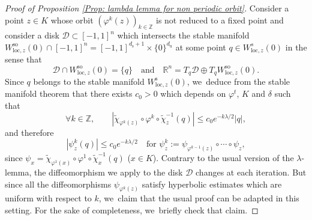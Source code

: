 \documentclass[JEP,XML,SOM,Unicode,NoEqCountersInSection,NoFloatCountersInSection,published]{cedram}
\newcommand{\loc}{\mathrm{loc}}
\newcommand{\rs}{\mathrm{s}}
\newcommand{\rso}{\mathrm{so}}
\newcommand{\ru}{\mathrm{u}}
\theoremstyle{definition}
\theoremstyle{plain}
\newcommand{\D}{\mathcal{D}}
\newcommand{\R}{\mathbb{R}}
\newcommand{\Z}{\mathbb{Z}}
\begin{document}
\begin{appendix}
\begin{proof}[Proof of Proposition \ref{Prop: lambda lemma for non periodic orbit}]
Consider a point $z \in K$ whose orbit $(\varphi^k (z))_{k \in \Z}$ is not reduced to a fixed point and consider a disk $\D \subset [-1,1]^n$ which intersects the stable manifold $W_{\loc,z}^{\rso} (0) \cap [-1,1]^n =[-1,1]^{d_\rs +1} \times \{0\}^{d_\ru} $ at some point $q \in W_{\loc,z}^{s} (0)$ in the sense that
\[
\D \cap W_{\loc,z}^{\rso} (0) = \{q\} \quad \text{and} \quad \R^n = T_q \D \oplus T_q W_{\loc,z}^{\rso} (0).
\]
Since $q$ belongs to the stable manifold $ W_{\loc,z}^\rs (0)$, we~deduce from the stable manifold theorem that there exists $c_0 > 0$ which depends on $\varphi^t$, $K$ and $\delta$ such that
\[
\forall k \in \Z, \qquad | \widetilde{\chi}_{\varphi^k (z)} \circ \varphi^k \circ \widetilde{\chi}_{z}^{-1} (q)| \leq c_0 e^{- k\lambda /2} |q|,
\]
and therefore
\[
\left| \psi_z^k (q) \right| \leq c_0 e^{- k \lambda / 2} \quad \text{for } \psi_{z}^k:= \psi_{\varphi^{k-1}(z)} \circ \cdots \circ \psi_{z},
\]
since $\psi_x = \widetilde{\chi}_{\varphi^1 (x)} \circ \varphi^1 \circ \widetilde{\chi}_{x}^{-1} (q)$ ($x \in K$).
Contrary to the usual version of the $\lambda$-lemma, the diffeomorphism we apply to the disk $\D$ changes at each iteration. But since all the diffeomorphisms $\psi_{\varphi^k (z)}$ satisfy hyperbolic estimates which are uniform with respect to $k$, we~claim that the usual proof can be adapted in this setting. For the sake of completeness, we~briefly check that claim.


\end{proof}
\end{appendix}
\end{document}
